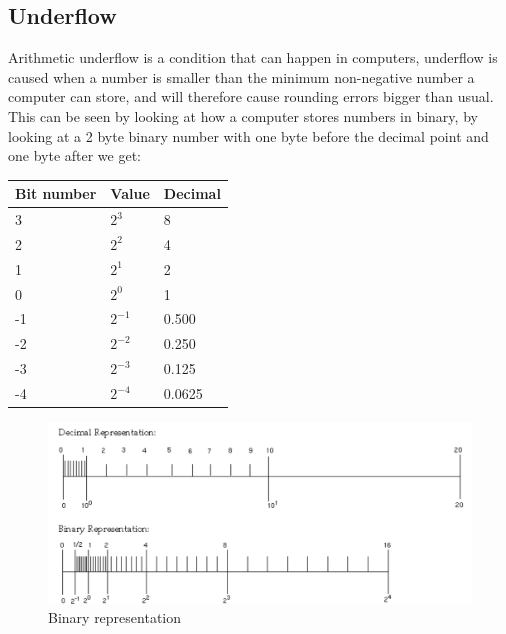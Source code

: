 \subsection{Underflow}
    Arithmetic underflow is a condition that can happen in computers, underflow is caused when a number is smaller than the minimum non-negative number a computer can store, and will therefore cause rounding errors bigger than usual. This can be seen by looking at how a computer stores numbers in binary, by looking at a 2 byte binary number with one byte before the decimal point and one byte after we get:\\

\begin{table}[!h]
    \begin{tabular}{|l|l|l|}
        \hline
        Bit number & Value    & Decimal \\ \hline
        3          & $2^3$    & 8       \\ 
        2          & $2^2$    & 4       \\ 
        1          & $2^1$    & 2       \\ 
        0          & $2^0$    & 1       \\ 
        -1         & $2^{-1}$ & 0.500   \\ 
        -2         & $2^{-2}$ & 0.250   \\ 
        -3         & $2^{-3}$ & 0.125   \\ 
        -4         & $2^{-4}$ & 0.0625  \\
        \hline
    \end{tabular}
\end{table}

	\begin{figure}
		\centering
		\includegraphics[width=1\linewidth]{pictures/binary_underflow.png}
		\caption{Binary representation}
		\label{fig:binary_underflow}
	\end{figure}


